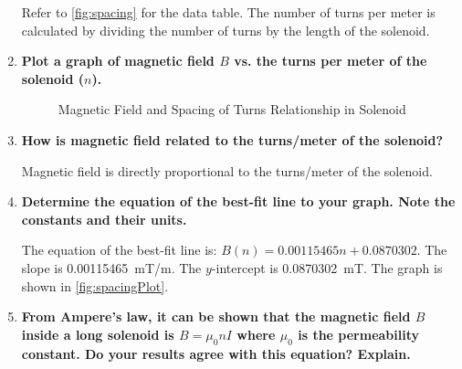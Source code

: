 \documentclass[article, 12pt]{article}
\begin{document}
\begin{enumerate}[1.]
         Refer to \autoref{fig:spacing} for the data table. The number of turns per meter is calculated by dividing the number of turns by the length of the solenoid.
         \item \textbf{Plot a graph of magnetic field $B$ vs. the turns per meter of the solenoid ($n$).}
         
         \begin{figure}[H]
            \centering
            \caption{Magnetic Field and Spacing of Turns Relationship in Solenoid}
            \label{fig:spacingPlot}
         \end{figure}
         \item \textbf{How is magnetic field related to the turns/meter of the solenoid?}
         
         Magnetic field is directly proportional to the turns/meter of the solenoid.
         \item \textbf{Determine the equation of the best-fit line to your graph. Note the constants and their units.}
         
         The equation of the best-fit line is: $B(n) = 0.00115465n + 0.0870302$. The slope is \SI{0.00115465}{\milli\tesla/\meter}. The $y$-intercept is \SI{0.0870302}{\milli\tesla}. The graph is shown in \autoref{fig:spacingPlot}.
         \item \textbf{From Ampere's law, it can be shown that the magnetic field $B$ inside a long solenoid
         is $B =\mu_0 n I$ where $\mu_0$ is the permeability constant. Do your results agree with this equation? Explain.}


\end{enumerate}
\end{document}

